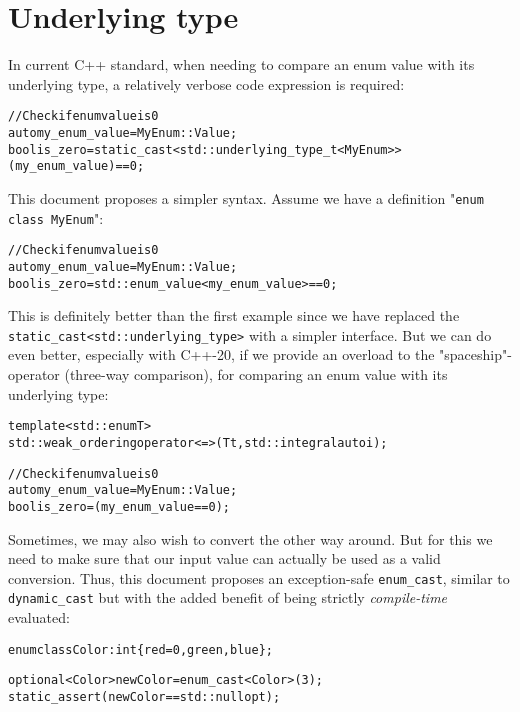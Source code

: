 \documentclass[a4paper, 12pt]{article}
\begin{document}
\section{Underlying type}

In current C++ standard, when needing to compare an enum value with its
underlying type, a relatively verbose code expression is required:

\begin{alltt}\footnotesize
// Check if enum value is 0
auto my\_enum\_value = MyEnum::Value;
bool is\_zero = static\_cast<std::underlying\_type\_t<MyEnum>>(my\_enum\_value) == 0;
\end{alltt}

\noindent
This document proposes a simpler syntax. Assume we have a definition
"\texttt{enum class MyEnum}":

\begin{alltt}\footnotesize
// Check if enum value is 0
auto my\_enum\_value = MyEnum::Value;
bool is\_zero = std::enum\_value<my\_enum\_value> == 0;
\end{alltt}

\noindent
This is definitely better than the first example since we have replaced
the\\ \texttt{static\_cast<std::underlying\_type>} with a simpler interface.
But we can do even better, especially with C++-20, if we provide an overload
to the "spaceship"-operator (three-way comparison), for comparing an enum value
with its underlying type:

\begin{alltt}\footnotesize
template<std::enum T>
std::weak\_ordering operator<=>(T t, std::integral auto i);

// Check if enum value is 0
auto my\_enum\_value = MyEnum::Value;
bool is\_zero = (my\_enum\_value == 0);
\end{alltt}

\noindent
Sometimes, we may also wish to convert the other way around. But for this
we need to make sure that our input value can actually be used as a valid
conversion. Thus, this document proposes an exception-safe \texttt{enum\_cast},
similar to \texttt{dynamic\_cast} but with the added benefit of being strictly
\textit{compile-time} evaluated:

\begin{alltt}\footnotesize
enum class Color : int \{ red = 0, green, blue \};

optional<Color> newColor = enum\_cast<Color>(3);
static\_assert(newColor == std::nullopt);
\end{alltt}
\end{document}
